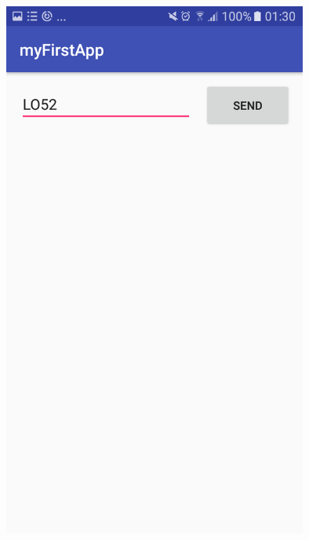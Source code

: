 \documentclass[french,a4paper,12pt]{report}
\begin{document}
 \includegraphics[width=10cm]{21.png}
\end{document}
